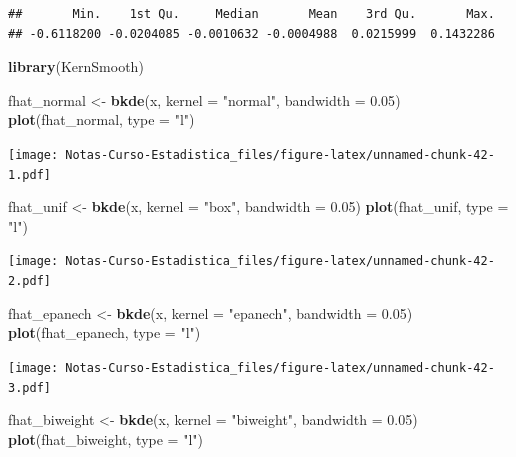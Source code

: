 \documentclass[
  12pt,
]{book}
\newenvironment{Shaded}{\begin{snugshade}}{\end{snugshade}}
\newcommand{\DataTypeTok}[1]{\textcolor[rgb]{0.13,0.29,0.53}{#1}}
\newcommand{\FloatTok}[1]{\textcolor[rgb]{0.00,0.00,0.81}{#1}}
\newcommand{\KeywordTok}[1]{\textcolor[rgb]{0.13,0.29,0.53}{\textbf{#1}}}
\newcommand{\NormalTok}[1]{#1}
\newcommand{\StringTok}[1]{\textcolor[rgb]{0.31,0.60,0.02}{#1}}
\theoremstyle{definition}
\theoremstyle{definition}
\theoremstyle{definition}
\theoremstyle{remark}
\begin{document}
\begin{verbatim}
##       Min.    1st Qu.     Median       Mean    3rd Qu.       Max. 
## -0.6118200 -0.0204085 -0.0010632 -0.0004988  0.0215999  0.1432286
\end{verbatim}

\begin{Shaded}
\begin{Highlighting}[]
\KeywordTok{library}\NormalTok{(KernSmooth)}

\NormalTok{fhat_normal <-}\StringTok{ }\KeywordTok{bkde}\NormalTok{(x, }\DataTypeTok{kernel =} \StringTok{"normal"}\NormalTok{, }\DataTypeTok{bandwidth =} \FloatTok{0.05}\NormalTok{)}
\KeywordTok{plot}\NormalTok{(fhat_normal, }\DataTypeTok{type =} \StringTok{"l"}\NormalTok{)}
\end{Highlighting}
\end{Shaded}

\texttt{[image: Notas-Curso-Estadistica\_files/figure-latex/unnamed-chunk-42-1.pdf]}

\begin{Shaded}
\begin{Highlighting}[]
\NormalTok{fhat_unif <-}\StringTok{ }\KeywordTok{bkde}\NormalTok{(x, }\DataTypeTok{kernel =} \StringTok{"box"}\NormalTok{, }\DataTypeTok{bandwidth =} \FloatTok{0.05}\NormalTok{)}
\KeywordTok{plot}\NormalTok{(fhat_unif, }\DataTypeTok{type =} \StringTok{"l"}\NormalTok{)}
\end{Highlighting}
\end{Shaded}

\texttt{[image: Notas-Curso-Estadistica\_files/figure-latex/unnamed-chunk-42-2.pdf]}

\begin{Shaded}
\begin{Highlighting}[]
\NormalTok{fhat_epanech <-}\StringTok{ }\KeywordTok{bkde}\NormalTok{(x, }\DataTypeTok{kernel =} \StringTok{"epanech"}\NormalTok{, }\DataTypeTok{bandwidth =} \FloatTok{0.05}\NormalTok{)}
\KeywordTok{plot}\NormalTok{(fhat_epanech, }\DataTypeTok{type =} \StringTok{"l"}\NormalTok{)}
\end{Highlighting}
\end{Shaded}

\texttt{[image: Notas-Curso-Estadistica\_files/figure-latex/unnamed-chunk-42-3.pdf]}

\begin{Shaded}
\begin{Highlighting}[]
\NormalTok{fhat_biweight <-}\StringTok{ }\KeywordTok{bkde}\NormalTok{(x, }\DataTypeTok{kernel =} \StringTok{"biweight"}\NormalTok{, }\DataTypeTok{bandwidth =} \FloatTok{0.05}\NormalTok{)}
\KeywordTok{plot}\NormalTok{(fhat_biweight, }\DataTypeTok{type =} \StringTok{"l"}\NormalTok{)}
\end{Highlighting}
\end{Shaded}
\end{document}
